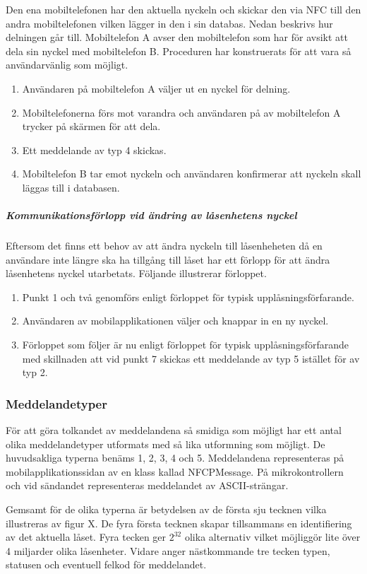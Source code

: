 \documentclass[11pt]{article}
\begin{document}
Den ena mobiltelefonen har den aktuella nyckeln och skickar den via NFC till den andra mobiltelefonen vilken lägger in den i sin databas. Nedan beskrivs hur delningen går till. Mobiltelefon A avser den mobiltelefon som har för avsikt att dela sin nyckel med mobiltelefon B. Proceduren har konstruerats för att vara så användarvänlig som möjligt.

\begin{enumerate}
\item Användaren på mobiltelefon A väljer ut en nyckel för delning.
\item Mobiltelefonerna förs mot varandra och användaren på av mobiltelefon A trycker på skärmen för att dela.
\item Ett meddelande av typ 4 skickas.
\item Mobiltelefon B tar emot nyckeln och användaren konfirmerar att nyckeln skall läggas till i databasen.
\end{enumerate}

\subparagraph{Kommunikationsförlopp vid ändring av låsenhetens nyckel}
Eftersom det finns ett behov av att ändra nyckeln till låsenheheten då en användare inte längre ska ha tillgång till låset har ett förlopp för att ändra låsenhetens nyckel utarbetats. Följande illustrerar förloppet.

\begin{enumerate}
\item Punkt 1 och två genomförs enligt förloppet för typisk upplåsningsförfarande.
\item Användaren av mobilapplikationen väljer och knappar in en ny nyckel.
\item Förloppet som följer är nu enligt förloppet för typisk upplåsningsförfarande med skillnaden att vid punkt 7 skickas ett meddelande av typ 5 istället för av typ 2.
\end{enumerate}

\subsubsection{Meddelandetyper}
För att göra tolkandet av meddelandena så smidiga som möjligt har ett antal olika meddelandetyper utformats med så lika utformning som möjligt. De huvudsakliga typerna benäms 1, 2, 3, 4 och 5. Meddelandena representeras på mobilapplikationssidan av en klass kallad NFCPMessage. På mikrokontrollern och vid sändandet representeras meddelandet av ASCII-strängar. 

Gemsamt för de olika typerna är betydelsen av de första sju tecknen vilka illustreras av figur X. De fyra första tecknen skapar tillsammans en identifiering av det aktuella låset. Fyra tecken ger $2^{32}$ olika alternativ vilket möjliggör lite över 4 miljarder olika låsenheter. Vidare anger nästkommande tre tecken typen, statusen och eventuell felkod för meddelandet. 
\end{document}
